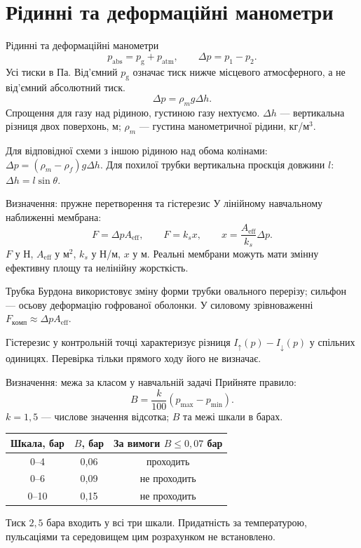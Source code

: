 \documentclass[aspectratio=169,11pt]{beamer}
\begin{document}
\section{Рідинні та деформаційні манометри}
\begin{frame}{Рідинні та деформаційні манометри}
\[
 p_{\mathrm{abs}}=p_{\mathrm{g}}+p_{\mathrm{atm}},\qquad \Delta p=p_1-p_2.
\]
Усі тиски в Па. Від'ємний $p_{\mathrm{g}}$ означає тиск нижче місцевого атмосферного, а не від'ємний абсолютний тиск.
\[
 \Delta p=\rho_mg\Delta h.
\]
Спрощення для газу над рідиною, густиною газу нехтуємо. $\Delta h$ --- вертикальна різниця двох поверхонь, м; $\rho_m$ --- густина манометричної рідини, кг/м$^3$.

Для відповідної схеми з іншою рідиною над обома колінами:
$\Delta p=(\rho_m-\rho_f)g\Delta h$. Для похилої трубки вертикальна проєкція довжини $l$: $\Delta h=l\sin\theta$.
\end{frame}
\begin{frame}{Визначення: пружне перетворення та гістерезис}
У лінійному навчальному наближенні мембрана:
\[
 F=\Delta p A_{\mathrm{eff}},\qquad F=k_s x,\qquad
 x=\frac{A_{\mathrm{eff}}}{k_s}\Delta p.
\]
$F$ у Н, $A_{\mathrm{eff}}$ у м$^2$, $k_s$ у Н/м, $x$ у м. Реальні мембрани можуть мати змінну ефективну площу та нелінійну жорсткість.

Трубка Бурдона використовує зміну форми трубки овального перерізу; сильфон --- осьову деформацію гофрованої оболонки. У силовому зрівноваженні $F_{\mathrm{комп}}\approx\Delta p A_{\mathrm{eff}}$.

Гістерезис у контрольній точці характеризує різниця $I_{\uparrow}(p)-I_{\downarrow}(p)$ у спільних одиницях. Перевірка тільки прямого ходу його не визначає.
\end{frame}
\begin{frame}{Визначення: межа за класом у навчальній задачі}
Прийняте правило:
\[
 B=\frac{k}{100}(p_{\max}-p_{\min}).
\]
$k=1{,}5$ --- числове значення відсотка; $B$ та межі шкали в барах.
\begin{center}\begin{tabular}{ccc}\toprule
Шкала, бар & $B$, бар & За вимоги $B\le0{,}07$ бар \\\midrule
0--4 & 0,06 & проходить \\
0--6 & 0,09 & не проходить \\
0--10 & 0,15 & не проходить \\\bottomrule
\end{tabular}\end{center}
Тиск $2{,}5$ бара входить у всі три шкали. Придатність за температурою, пульсаціями та середовищем цим розрахунком не встановлено.
\end{frame}
\end{document}
